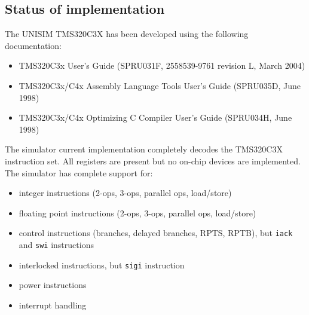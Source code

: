 \subsection{Status of implementation}

The UNISIM TMS320C3X has been developed using the following documentation:
\begin{itemize}
\item TMS320C3x User’s Guide (SPRU031F, 2558539-9761 revision L, March 2004)
\item TMS320C3x/C4x Assembly Language Tools User’s Guide (SPRU035D, June 1998)
\item TMS320C3x/C4x Optimizing C Compiler User’s Guide (SPRU034H, June 1998)
\end{itemize}

The simulator current implementation completely decodes the TMS320C3X instruction set.
All registers are present but no on-chip devices are implemented.
The simulator has complete support for:
\begin{itemize}
\item integer instructions (2-ops, 3-ops, parallel ops, load/store)
\item floating point instructions (2-ops, 3-ops, parallel ops, load/store)
\item control instructions (branches, delayed branches, RPTS, RPTB), but \texttt{iack} and \texttt{swi} instructions
\item interlocked instructions, but \texttt{sigi} instruction
\item power instructions
\item interrupt handling
\end{itemize}

